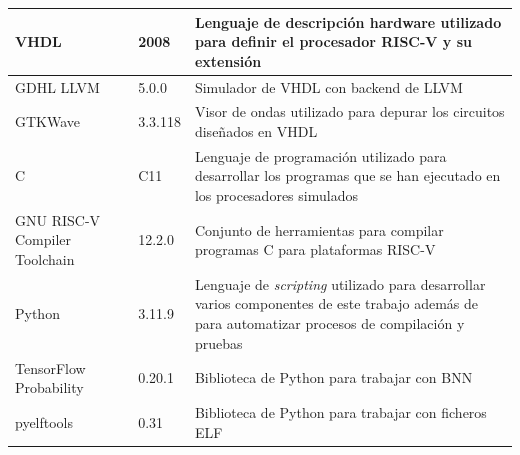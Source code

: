 \begin{center}
\begin{longtable}{|p{}|p{}|p{}|}
VHDL                                    & 2008                                                                                                                                         & Lenguaje de descripción hardware utilizado para definir el procesador RISC-V y su extensión                                                       \\\hline
GDHL LLVM \cite{ghdl}& 5.0.0                                                                                                                                        & Simulador de VHDL con backend de LLVM                                                                                                            \\\hline
GTKWave \cite{gtkwave}& 3.3.118                                                                                                                                      & Visor de ondas utilizado para depurar los circuitos diseñados en VHDL                                                                                                                                  \\\hline
C                                       & C11                                                                                                                                          & Lenguaje de programación utilizado para desarrollar los programas que se han ejecutado en los procesadores simulados                             \\\hline
GNU RISC-V Compiler Toolchain \cite{gcc_riscv}& 12.2.0                                                                                                                                       & Conjunto de herramientas para compilar programas C para plataformas RISC-V                                                                       \\\hline
Python                                  & 3.11.9& Lenguaje de \textit{scripting} utilizado para desarrollar varios componentes de este trabajo además de para automatizar procesos de compilación y pruebas \\\hline
TensorFlow Probability \cite{tfprob}& 0.20.1                                                                                                                                       & Biblioteca de Python para trabajar con BNN\\\hline
pyelftools \cite{pyelftools}& 0.31                                                                                                                                         & Biblioteca de Python para trabajar con ficheros ELF\\\hline

\end{longtable}
\end{center}
